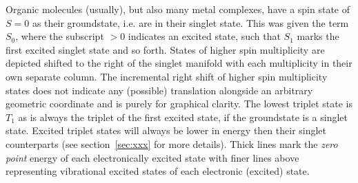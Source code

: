 		Organic molecules (usually), but also many metal complexes, have a spin state of $S = 0$ as their groundstate, i.e. are in their singlet state. This was given the term $S_0$, where the subscript $> 0$ indicates an excited state, such that $S_1$ marks the first excited singlet state and so forth. States of higher spin multiplicity are depicted shifted to the right of the singlet manifold with each multiplicity in their own separate column. The incremental right shift of higher spin multiplicity states does not indicate any (possible) translation alongside an arbitrary geometric coordinate and is purely for graphical clarity. The lowest triplet state is $T_1$ as is always the triplet of the first excited state, if the groundstate is a singlet state. Excited triplet states will always be lower in energy then their singlet counterparts (see section~\ref{sec:xxx} for more details). Thick lines mark the \emph{zero point} energy of each electronically excited state with finer lines above representing vibrational excited states of each electronic (excited) state. 

